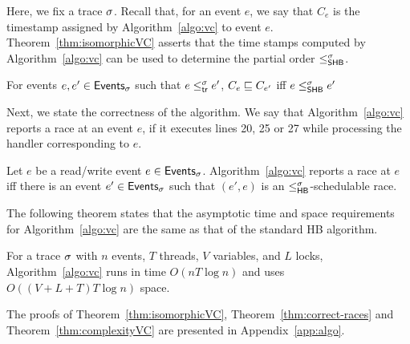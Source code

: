 Here, we fix a trace $\sigma$.  Recall that, for an event $e$, we say
that $C_e$ is the timestamp assigned by Algorithm~\ref{algo:vc} to
event $e$.  Theorem~\ref{thm:isomorphicVC} asserts that the time
stamps computed by Algorithm~\ref{algo:vc} can be used to determine
the partial order $\leq^{\sigma}_{\mathsf{SHB}}$.

\begin{theorem}
\label{thm:isomorphicVC}
For events $e, e' \in \mathsf{Events}_{\sigma}$ such that $e \leq^{\sigma}_{\mathsf{tr}} e'$,
$C_e \sqsubseteq C_{e'}$ iff $e \leq^{\sigma}_{\mathsf{SHB}} e'$
\end{theorem}

Next, we state the correctness of the algorithm.
We say that Algorithm~\ref{algo:vc} reports a race
at an event $e$, if it executes lines 20, 25 or 27
while processing the handler corresponding to $e$.

\begin{theorem}
\label{thm:correct-races}
Let $e$ be a read/write event $e \in \mathsf{Events}_{\sigma}$.
Algorithm~\ref{algo:vc} reports a race at $e$
iff there is an event $e' \in \mathsf{Events}_{\sigma}$ such that $(e', e)$
is an $\leq^{\sigma}_{\mathsf{HB}}$-schedulable race.
\end{theorem}

The following theorem states that the asymptotic 
time and space requirements for Algorithm~\ref{algo:vc}
are the same as that of the standard HB algorithm.

\begin{theorem}
\label{thm:complexityVC}
For a trace $\sigma$ with $n$ events, $T$ threads, $V$ variables, and $L$
locks, Algorithm~\ref{algo:vc} runs in time $O(nT\log n)$ and uses
$O((V+L+T)T\log n)$ space.
\end{theorem}

The proofs of Theorem~\ref{thm:isomorphicVC}, Theorem~\ref{thm:correct-races} and
Theorem~\ref{thm:complexityVC} are presented in Appendix~\ref{app:algo}.

